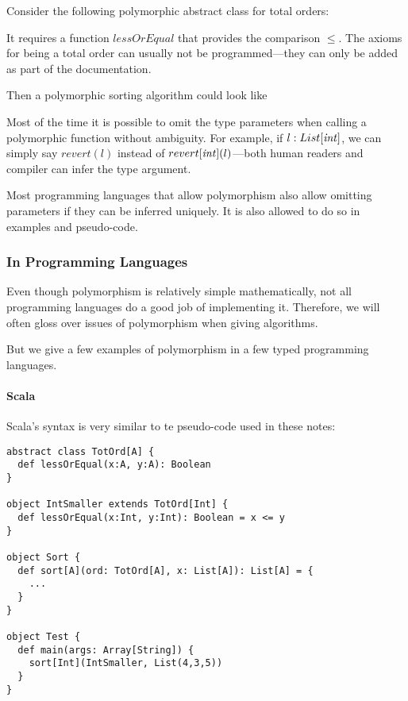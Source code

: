 \begin{example}
Consider the following polymorphic abstract class for total orders:
\begin{acode}
\end{acode}
It requires a function $lessOrEqual$ that provides the comparison $\leq$.
The axioms for being a total order can usually not be programmed---they can only be added as part of the documentation.

Then a polymorphic sorting algorithm could look like
\begin{acode}
\end{acode}
\end{example}

\begin{notation}
Most of the time it is possible to omit the type parameters when calling a polymorphic function without ambiguity.
For example, if $l: List[\mathit{int}]$, we can simply say $revert(l)$ instead of $revert[\mathit{int}](l)$---both human readers and compiler can infer the type argument.

Most programming languages that allow polymorphism also allow omitting parameters if they can be inferred uniquely.
It is also allowed to do so in examples and pseudo-code.
\end{notation}

\subsubsection{In Programming Languages}

Even though polymorphism is relatively simple mathematically, not all programming languages do a good job of implementing it.
Therefore, we will often gloss over issues of polymorphism when giving algorithms.

But we give a few examples of polymorphism in a few typed programming languages.

\paragraph{Scala}
Scala's syntax is very similar to te pseudo-code used in these notes:

\begin{lstlisting}
abstract class TotOrd[A] {
  def lessOrEqual(x:A, y:A): Boolean
}

object IntSmaller extends TotOrd[Int] {
  def lessOrEqual(x:Int, y:Int): Boolean = x <= y
}

object Sort {
  def sort[A](ord: TotOrd[A], x: List[A]): List[A] = {
    ...
  }
}

object Test {
  def main(args: Array[String]) {
    sort[Int](IntSmaller, List(4,3,5))
  }
}
\end{lstlisting}

